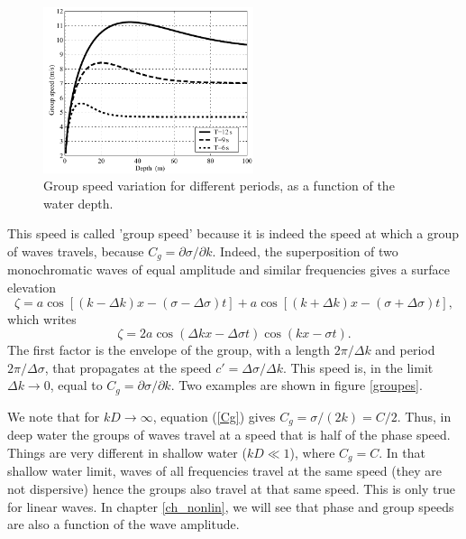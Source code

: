 \begin{figure}
\centerline{\includegraphics[width=0.55\textwidth]{FIGS_CH_AIRY/cg_en.pdf}}
  \caption{Group speed variation for different periods, as a function of the water depth.}
\label{Cgplot}
\end{figure}

This speed is called 'group speed' because it is indeed the speed at which a group of waves travels, because $C_g=\partial
\sigma/\partial k$. Indeed, the superposition of two monochromatic waves of equal amplitude and similar frequencies gives a surface elevation 
\begin{equation}
    \zeta=a  \cos \left[ \left(k - \Delta k \right) x - \left(\sigma-\Delta \sigma \right) t \right]
        + a  \cos \left[ \left(k + \Delta k \right) x - \left(\sigma+\Delta \sigma \right) t\right]  ,
\end{equation}
which writes
\begin{equation}
    \zeta=2 a \cos \left(\Delta k x -\Delta \sigma t\right)
    \cos \left( k x - \sigma t\right).
\end{equation}
The first factor is the envelope of the group, with a length  $2 \pi /
\Delta k $ and period $2\pi / \Delta \sigma$, that propagates at the speed 
$c'=\Delta \sigma /\Delta k $. This speed is, in the limit  $\Delta k \rightarrow 0$, equal to 
$C_g=\partial \sigma/\partial k$. Two examples are shown in figure 
\ref{groupes}.


We note that for $kD\rightarrow\infty$, equation (\ref{Cg}) gives
$C_g={\sigma}/({2k})=C/2$. Thus, in deep water the groups of waves travel at a speed that is half of the phase speed. 
Things are very different in shallow water ($kD
\ll 1$), where $C_g=C$. In that shallow water limit, waves of all frequencies travel at the same speed (they are not dispersive)
hence the groups also travel at that same speed. This is only true for linear waves. In chapter \ref{ch_nonlin}, we will see that  phase and group speeds 
are also a function of the wave amplitude. 


